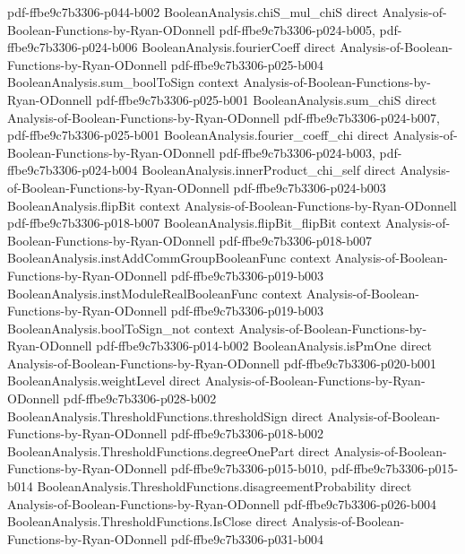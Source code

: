 \begin{theorem}
  {pdf-ffbe9c7b3306-p044-b002}
\proofstep
  {BooleanAnalysis.chiS_mul_chiS}
  {direct}
  {Analysis-of-Boolean-Functions-by-Ryan-ODonnell}
  {pdf-ffbe9c7b3306-p024-b005,
    pdf-ffbe9c7b3306-p024-b006}
\proofstep
  {BooleanAnalysis.fourierCoeff}
  {direct}
  {Analysis-of-Boolean-Functions-by-Ryan-ODonnell}
  {pdf-ffbe9c7b3306-p025-b004}
\proofstep
  {BooleanAnalysis.sum_boolToSign}
  {context}
  {Analysis-of-Boolean-Functions-by-Ryan-ODonnell}
  {pdf-ffbe9c7b3306-p025-b001}
\proofstep
  {BooleanAnalysis.sum_chiS}
  {direct}
  {Analysis-of-Boolean-Functions-by-Ryan-ODonnell}
  {pdf-ffbe9c7b3306-p024-b007,
    pdf-ffbe9c7b3306-p025-b001}
\proofstep
  {BooleanAnalysis.fourier_coeff_chi}
  {direct}
  {Analysis-of-Boolean-Functions-by-Ryan-ODonnell}
  {pdf-ffbe9c7b3306-p024-b003,
    pdf-ffbe9c7b3306-p024-b004}
\proofstep
  {BooleanAnalysis.innerProduct_chi_self}
  {direct}
  {Analysis-of-Boolean-Functions-by-Ryan-ODonnell}
  {pdf-ffbe9c7b3306-p024-b003}
\proofstep
  {BooleanAnalysis.flipBit}
  {context}
  {Analysis-of-Boolean-Functions-by-Ryan-ODonnell}
  {pdf-ffbe9c7b3306-p018-b007}
\proofstep
  {BooleanAnalysis.flipBit_flipBit}
  {context}
  {Analysis-of-Boolean-Functions-by-Ryan-ODonnell}
  {pdf-ffbe9c7b3306-p018-b007}
\proofstep
  {BooleanAnalysis.instAddCommGroupBooleanFunc}
  {context}
  {Analysis-of-Boolean-Functions-by-Ryan-ODonnell}
  {pdf-ffbe9c7b3306-p019-b003}
\proofstep
  {BooleanAnalysis.instModuleRealBooleanFunc}
  {context}
  {Analysis-of-Boolean-Functions-by-Ryan-ODonnell}
  {pdf-ffbe9c7b3306-p019-b003}
\proofstep
  {BooleanAnalysis.boolToSign_not}
  {context}
  {Analysis-of-Boolean-Functions-by-Ryan-ODonnell}
  {pdf-ffbe9c7b3306-p014-b002}
\proofstep
  {BooleanAnalysis.isPmOne}
  {direct}
  {Analysis-of-Boolean-Functions-by-Ryan-ODonnell}
  {pdf-ffbe9c7b3306-p020-b001}
\proofstep
  {BooleanAnalysis.weightLevel}
  {direct}
  {Analysis-of-Boolean-Functions-by-Ryan-ODonnell}
  {pdf-ffbe9c7b3306-p028-b002}
\proofstep
  {BooleanAnalysis.ThresholdFunctions.thresholdSign}
  {direct}
  {Analysis-of-Boolean-Functions-by-Ryan-ODonnell}
  {pdf-ffbe9c7b3306-p018-b002}
\proofstep
  {BooleanAnalysis.ThresholdFunctions.degreeOnePart}
  {direct}
  {Analysis-of-Boolean-Functions-by-Ryan-ODonnell}
  {pdf-ffbe9c7b3306-p015-b010,
    pdf-ffbe9c7b3306-p015-b014}
\proofstep
  {BooleanAnalysis.ThresholdFunctions.disagreementProbability}
  {direct}
  {Analysis-of-Boolean-Functions-by-Ryan-ODonnell}
  {pdf-ffbe9c7b3306-p026-b004}
\proofstep
  {BooleanAnalysis.ThresholdFunctions.IsClose}
  {direct}
  {Analysis-of-Boolean-Functions-by-Ryan-ODonnell}
  {pdf-ffbe9c7b3306-p031-b004}

\end{theorem}

